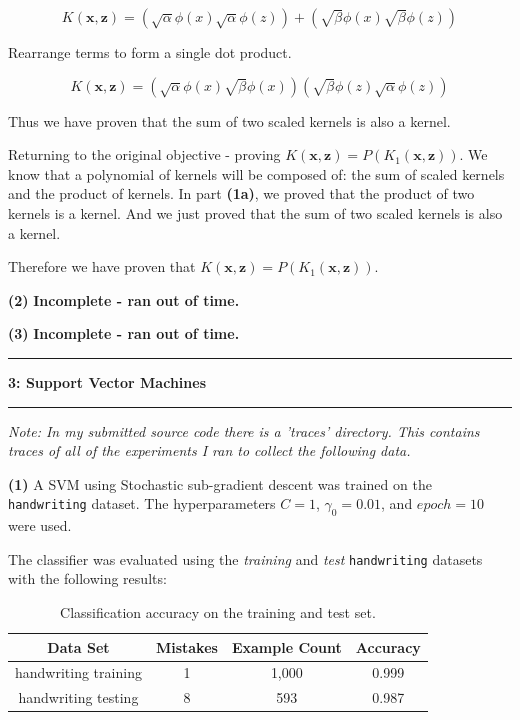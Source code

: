 \documentclass[11pt]{article}
\newcommand\question[2]{\vspace{.25in}\hrule\textbf{#1: #2}\vspace{.5em}\hrule\vspace{.10in}}
\renewcommand\part[1]{\vspace{.10in}\textbf{(#1)}}
\begin{document}
$$K(\mathbf{x, z}) = (\sqrt{\alpha}\phi(x)\sqrt{\alpha}\phi(z)) + (\sqrt{\beta}\phi(x)\sqrt{\beta}\phi(z))$$

Rearrange terms to form a single dot product.

$$K(\mathbf{x, z}) = (\sqrt{\alpha}\phi(x)\sqrt{\beta}\phi(x))(\sqrt{\beta}\phi(z)\sqrt{\alpha}\phi(z))$$

Thus we have proven that the sum of two scaled kernels is also a kernel.

Returning to the original objective - proving $K(\mathbf{x, z}) = P(K_1(\mathbf{x, z}))$. We know that a polynomial of kernels will be composed of: the sum of scaled kernels and the product of kernels. In part \textbf{(1a)}, we proved that the product of two kernels is a kernel. And we just proved that the sum of two scaled kernels is also a kernel.

Therefore we have proven that $K(\mathbf{x, z}) = P(K_1(\mathbf{x, z}))$.

\part{2} \textbf{Incomplete - ran out of time.}

\part{3} \textbf{Incomplete - ran out of time.}

\question{3}{Support Vector Machines}
\textit{Note: In my submitted source code there is a 'traces' directory. This contains traces of all of the experiments I ran to collect the following data.}

\part{1} A SVM using Stochastic sub-gradient descent was trained on the {\tt handwriting} dataset. The hyperparameters $C = 1$, $\gamma_0 = 0.01$, and $epoch = 10$ were used.

The classifier was evaluated using the \textit{training} and \textit{test} {\tt handwriting} datasets with the following results:

\begin{table}[H]
\centering
{\renewcommand{\arraystretch}{1.2}%
\begin{tabular}{| c | c | c | c |}
\hline
Data Set & Mistakes & Example Count & Accuracy\\
\hline
handwriting training & 1 & 1,000 & 0.999\\ \hline
handwriting testing & 8 & 593 & 0.987\\ \hline
\end{tabular}}
\caption{Classification accuracy on the training and test set.}
\end{table}
\end{document}
